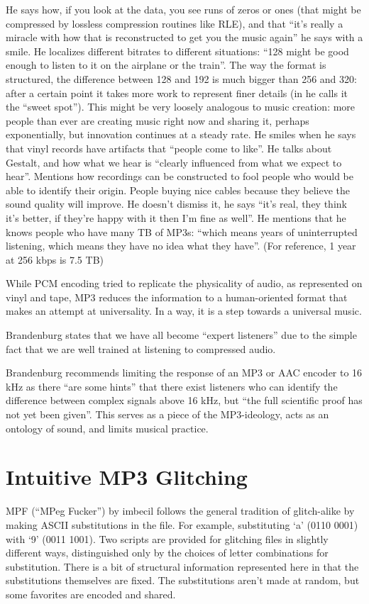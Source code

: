 \documentclass{thesis}
\begin{document}
He says how, if you look at the data, you see runs of zeros or ones (that might be compressed by lossless compression routines like RLE), and that ``it's really a miracle with how that is reconstructed to get you the music again'' he says with a smile. He localizes different bitrates to different situations: ``128 might be good enough to listen to it on the airplane or the train''. The way the format is structured, the difference between 128 and 192 is much bigger than 256 and 320: after a certain point it takes more work to represent finer details (in \cite[9]{karlheinz_brandenburg_mp3_1999} he calls it the ``sweet spot''). This might be very loosely analogous to music creation: more people than ever are creating music right now and sharing it, perhaps exponentially, but innovation continues at a steady rate. He smiles when he says that vinyl records have artifacts that ``people come to like''. He talks about Gestalt, and how what we hear is ``clearly influenced from what we expect to hear''. Mentions how recordings can be constructed to fool people who would be able to identify their origin. People buying nice cables because they believe the sound quality will improve. He doesn't dismiss it, he says ``it's real, they think it's better, if they're happy with it then I'm fine as well''. He mentions that he knows people who have many TB of MP3s: ``which means years of uninterrupted listening, which means they have no idea what they have''. (For reference, 1 year at 256 kbps is 7.5 TB) \cite{tom_merritt_real_2010}

While PCM encoding tried to replicate the physicality of audio, as represented on vinyl and tape, MP3 reduces the information to a human-oriented format that makes an attempt at universality. In a way, it is a step towards a universal music.

Brandenburg states that we have all become ``expert listeners'' due to the simple fact that we are well trained at listening to compressed audio.\cite[9]{karlheinz_brandenburg_mp3_1999}

Brandenburg recommends limiting the response of an MP3 or AAC encoder to 16 kHz as there ``are some hints'' that there exist listeners who can identify the difference between complex signals above 16 kHz, but ``the full scientific proof has not yet been given''.\cite[10]{karlheinz_brandenburg_mp3_1999} This serves as a piece of the MP3-ideology, acts as an ontology of sound, and limits musical practice.
	
\section{Intuitive MP3 Glitching}
	MPF (``MPeg Fucker'') by imbecil\cite{imbecil_mpeg_2004} follows the general tradition of glitch-alike by making ASCII substitutions in the file. For example, substituting `a' (0110 0001) with `9' (0011 1001). Two scripts are provided for glitching files in slightly different ways, distinguished only by the choices of letter combinations for substitution. There is a bit of structural information represented here in that the substitutions themselves are fixed. The substitutions aren't made at random, but some favorites are encoded and shared.
	
\end{document}
